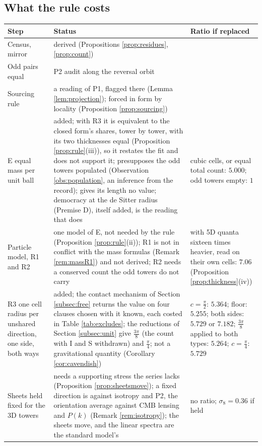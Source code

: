 \documentclass[11pt]{article}
\theoremstyle{definition}
\begin{document}
\subsection{What the rule costs}\label{subsec:costs}

\begin{table}[htbp]\centering\small
\begin{tabular}{>{\raggedright\arraybackslash}p{3.4cm}>{\raggedright\arraybackslash}p{6.6cm}>{\raggedright\arraybackslash}p{3.7cm}}
\toprule
Step & Status & Ratio if replaced \\
\midrule
Census, mirror & derived (Propositions \ref{prop:residues}, \ref{prop:count}) & \\
Odd pairs equal & P2 audit along the reversal orbit & \\
Sourcing rule & a reading of P1, flagged there (Lemma \ref{lem:projection}); forced in form by locality (Proposition \ref{prop:sourcing}) & \\
\midrule
E equal mass per unit ball & added; with R3 it is equivalent to the closed form's shares, tower by tower, with its two thicknesses equal (Proposition \ref{prop:rule}(iii)), so it restates the fit and does not support it; presupposes the odd towers populated (Observation \ref{obs:population}, an inference from the record); gives its length no value; democracy at the de Sitter radius (Premise D), itself added, is the reading that does & cubic cells, or equal total count: $5.000$; odd towers empty: $1$ \\
Particle model, R1 and R2 & one model of E, not needed by the rule (Proposition \ref{prop:rule}(ii)); R1 is not in conflict with the mass formulas (Remark \ref{rem:massR1}) and not derived; R2 needs a conserved count the odd towers do not carry & with 5D quanta sixteen times heavier, read on their own cells: $7.06$ (Proposition \ref{prop:thickness}(iv)) \\
R3 one cell radius per unshared direction, one side, both ways & added; the contact mechanism of Section \ref{subsec:free} returns the value on four clauses chosen with it known, each costed in Table \ref{tab:excludes}; the reductions of Section \ref{subsec:unit} give $\tfrac{3\pi}{8}$ (the count with I and S withdrawn) and $\tfrac{\pi}{4}$; not a gravitational quantity (Corollary \ref{cor:cavendish}) & $c = \tfrac{\pi}{2}$: $5.364$; floor: $5.255$; both sides: $5.729$ or $7.182$; $\tfrac{3\pi}{8}$ applied to both types: $5.264$; $c = \tfrac{\pi}{4}$: $5.729$ \\
Sheets held fixed for the 3D towers & needs a supporting stress the series lacks (Proposition \ref{prop:sheetsmove}); a fixed direction is against isotropy and P2, the orientation average against CMB lensing and $P(k)$ (Remark \ref{rem:isotropy}); the sheets move, and the linear spectra are the standard model's & no ratio; $\sigma_{8} = 0.36$ if held \\

\end{tabular}
\end{table}
\end{document}
